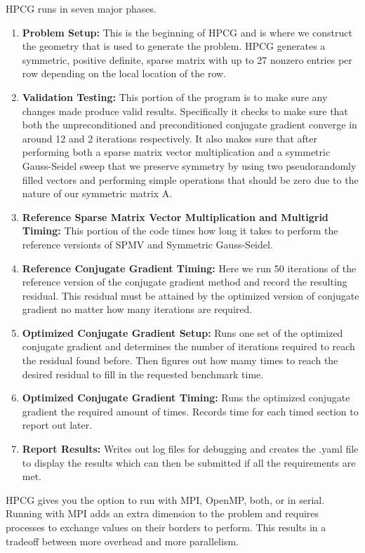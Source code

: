 \documentclass{ccr15}
\begin{document}
HPCG runs in seven major phases.
\begin{enumerate}
	\item \textbf{Problem Setup:} This is the beginning of HPCG and is where we construct the 
geometry that is used to generate the problem. HPCG generates a symmetric, positive definite, 
sparse matrix with up to 27 nonzero entries per row depending on the local location of the row.
	\item \textbf{Validation Testing:} This portion of the program is to make sure any changes 
made produce valid results. Specifically it checks to make sure that both the unpreconditioned 
and preconditioned conjugate gradient converge in around 12 and 2 iterations respectively. It 
also makes sure that after performing both a sparse matrix vector multiplication and a symmetric 
Gauss-Seidel sweep that we preserve symmetry by using two pseudorandomly filled vectors and 
performing simple operations that should be zero due to the nature of our symmetric matrix A.
	\item \textbf{Reference Sparse Matrix Vector Multiplication and Multigrid Timing:} This 
portion of the code times how long it takes to perform the reference versionts of SPMV and 
Symmetric Gauss-Seidel.
	\item \textbf{Reference Conjugate Gradient Timing:} Here we run 50 iterations of the reference
version of the conjugate gradient method and record the resulting residual. This residual must be
attained by the optimized version of conjugate gradient no matter how many iterations are
required.
	\item \textbf{Optimized Conjugate Gradient Setup:} Runs one set of the optimized conjugate
gradient and determines the number of iterations required to reach the residual found before.
Then figures out how mamy times to reach the desired residual to fill in the requested benchmark
time.
	\item \textbf{Optimized Conjugate Gradient Timing:} Runs the optimized conjugate gradient the
required amount of times. Records time for each timed section to report out later.
	\item \textbf{Report Results:} Writes out log files for debugging and creates the .yaml file
to display the results which can then be submitted if all the requirements are met.
\end{enumerate}
HPCG gives you the option to run with MPI, OpenMP, both, or in serial. Running with MPI adds an
extra dimension to the problem and requires processes to exchange values on their borders to
perform. This results in a tradeoff between more overhead and more parallelism.
\end{document}
